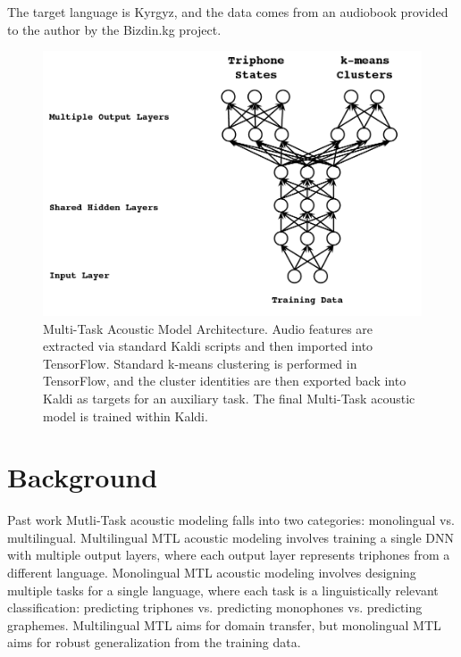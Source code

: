 \documentclass[a4paper]{article}
\begin{document}
The target language is Kyrgyz, and the data comes from an audiobook provided to the author by the Bizdin.kg project.

\begin{figure}[!htbp]
  \centering
{}
  \includegraphics[width=\linewidth]{figs/heigold-2013-dnn-c.png}
  \caption{Multi-Task Acoustic Model Architecture. Audio features are extracted via standard Kaldi scripts and then imported into TensorFlow. Standard k-means clustering is performed in TensorFlow, and the cluster identities are then exported back into Kaldi as targets for an auxiliary task. The final Multi-Task acoustic model is trained within Kaldi.}
    \label{fig:mtl-dnn}
  \endminipage\hfill
\end{figure}


\section{Background}

Past work Mutli-Task acoustic modeling falls into two categories: monolingual vs. multilingual. Multilingual MTL acoustic modeling involves training a single DNN with multiple output layers, where each output layer represents triphones from a different language. Monolingual MTL acoustic modeling involves designing multiple tasks for a single language, where each task is a linguistically relevant classification: predicting triphones vs. predicting monophones vs. predicting graphemes. Multilingual MTL aims for domain transfer, but monolingual MTL aims for robust generalization from the training data.

\end{document}
